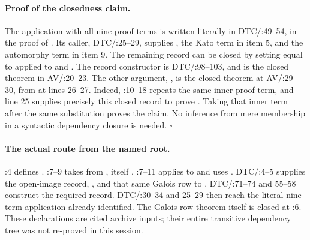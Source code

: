\paragraph{Proof of the closedness claim.}
The application with all nine proof terms is written literally in
DTC/:49--54, in the proof of
.
Its caller, DTC/:25--29,
supplies , the Kato term in item 5, and the automorphy term in
item 9.  The remaining record can be closed by setting
 equal to
applied to 
and .
The record constructor is
DTC/:98--103,
and  is the closed theorem in
AV/:20--23.
The other argument, , is
the closed theorem at
AV/:29--30,
from  at lines 26--27.
Indeed, :10--18 repeats the same inner
 proof term, and line 25 supplies precisely this closed
record to prove .  Taking that inner term after the same
substitution proves the claim.  No inference from mere membership in
a syntactic dependency closure is needed. \hfill$\square$

\paragraph{The actual route from the named root.}
:4 defines .
:7--9 takes
 from , itself
.
:7--11
applies  to
and uses .
DTC/:4--5 supplies the open-image record,
, and that same
Galois row to .
DTC/:71--74 and 55--58 construct the required
 record.
DTC/:30--34 and 25--29 then
reach the literal nine-term application already identified.
The Galois-row theorem itself is closed at
:6.
These declarations are cited archive inputs; their entire transitive
dependency tree was not re-proved in this session.

